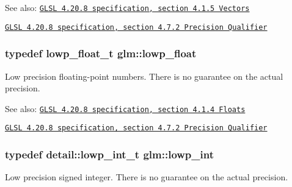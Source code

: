\begin{Desc}
\item[See also:]\href{http://www.opengl.org/registry/doc/GLSLangSpec.4.20.8.pdf}{\tt GLSL 4.20.8 specification, section 4.1.5 Vectors} 

\href{http://www.opengl.org/registry/doc/GLSLangSpec.4.20.8.pdf}{\tt GLSL 4.20.8 specification, section 4.7.2 Precision Qualifier} \end{Desc}
\hypertarget{group__core__precision_g2887fbc729ac5c1c5caeb7cd57a7145c}{
\subsubsection[lowp\_\-float]{\setlength{\rightskip}{0pt plus 5cm}typedef lowp\_\-float\_\-t {\bf glm::lowp\_\-float}}}
\label{group__core__precision_g2887fbc729ac5c1c5caeb7cd57a7145c}


Low precision floating-point numbers. There is no guarantee on the actual precision.

\begin{Desc}
\item[See also:]\href{http://www.opengl.org/registry/doc/GLSLangSpec.4.20.8.pdf}{\tt GLSL 4.20.8 specification, section 4.1.4 Floats} 

\href{http://www.opengl.org/registry/doc/GLSLangSpec.4.20.8.pdf}{\tt GLSL 4.20.8 specification, section 4.7.2 Precision Qualifier} \end{Desc}
\hypertarget{group__core__precision_g4681244bf4a184734f03aa9df4e3d288}{
\subsubsection[lowp\_\-int]{\setlength{\rightskip}{0pt plus 5cm}typedef detail::lowp\_\-int\_\-t {\bf glm::lowp\_\-int}}}
\label{group__core__precision_g4681244bf4a184734f03aa9df4e3d288}


Low precision signed integer. There is no guarantee on the actual precision.

